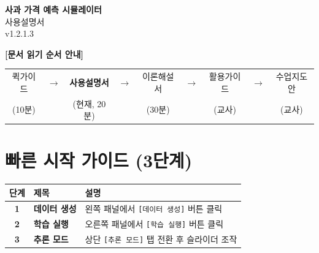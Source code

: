 \documentclass[11pt,a4paper]{article}
\begin{document}
\begin{center}
    {\Huge\bfseries\color{primaryblue} 사과 가격 예측 시뮬레이터}\\[8pt]
    {\Large 사용설명서}\\[6pt]
    {\large\color{textmedium} v1.2.1.3}\\[20pt]
\end{center}

\begin{guidebox}
\begin{center}
{\large\bfseries\color{primarygreen} [문서 읽기 순서 안내]}
\end{center}

\begin{center}
\begin{tabular}{ccccccccc}
퀵가이드 & $\rightarrow$ & \colorbox{accentyellow}{\textbf{사용설명서}} & $\rightarrow$ & 이론해설서 & $\rightarrow$ & 활용가이드 & $\rightarrow$ & 수업지도안 \\
(10분) & & (현재, 20분) & & (30분) & & (교사) & & (교사)
\end{tabular}
\end{center}
\end{guidebox}

\vspace{15pt}

\section*{빠른 시작 가이드 (3단계)}

\begin{center}
\begin{tabular}{|c|l|p{7cm}|}
\hline
\rowcolor{bggreen}
\textbf{단계} & \textbf{제목} & \textbf{설명} \\
\hline
\textbf{1} & \textcolor{primarygreen}{\textbf{데이터 생성}} & 왼쪽 패널에서 \texttt{[데이터 생성]} 버튼 클릭 \\
\hline
\textbf{2} & \textcolor{primaryblue}{\textbf{학습 실행}} & 오른쪽 패널에서 \texttt{[학습 실행]} 버튼 클릭 \\
\hline
\textbf{3} & \textcolor{primaryblue}{\textbf{추론 모드}} & 상단 \texttt{[추론 모드]} 탭 전환 후 슬라이더 조작 \\
\hline
\end{tabular}
\end{center}

\vspace{10pt}
\end{document}
